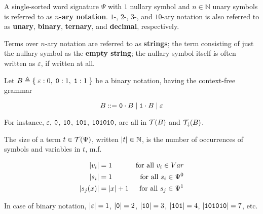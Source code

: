 \begin{definition} A single-sorted word signature $\Psi$ with $1$ nullary
symbol and $n \in \mathbb{N}$ unary symbols is referred to as \textbf{$n$-ary
notation}. $1$-, $2$-, $3$-, and $10$-ary notation is also referred to as
\textbf{unary}, \textbf{binary}, \textbf{ternary}, and \textbf{decimal},
respectively.  \end{definition}

\begin{definition} Terms over $n$-ary notation are referred to as
\textbf{strings}; the term consisting of just the nullary symbol as the
\textbf{empty string}; the nullary symbol itself is often written as
$\varepsilon$, if written at all. \end{definition} 

\begin{example} Let $B \triangleq \mathopen{}\left\{\mathrel{}{\varepsilon : 0, \; \mathtt{0} : 1, \;
\mathtt{1} : 1}\mathrel{}\right\}\mathclose{}$ be a binary notation, having the context-free grammar

$$B ::= \mathtt{0} \cdot B \mid \mathtt{1} \cdot B \mid \varepsilon$$

For instance, $\varepsilon$, $\mathtt{0}$, $\mathtt{1}\mathtt{0}$,
$\mathtt{1}\mathtt{0}\mathtt{1}$, $\mathtt{1}\mathtt{0}\mathtt{1}\mathtt{0}\mathtt{1}\mathtt{0}$,
are all in $\mathcal{T}{\mathopen{}\left({B}\right)\mathclose{}}$ and $\mathcal{T}_\downarrow{\ensuremath{\mathopen{}\left({B}\right)\mathclose{}}}$.

\end{example}

\begin{definition} \label{def:single-sort-word-term-size} The size of a term $t
\in \mathcal{T}{\mathopen{}\left({\Psi}\right)\mathclose{}}$, written ${\mathopen{}\left|{t}\right|\mathclose{}} \in \mathbb{N}$, is the number of
occurrences of symbols and variables in $t$, m.f.

\begin{align*}
{\ensuremath{\mathopen{}\left|{v_i}\right|\mathclose{}}} &= 1 & \text{for all $v_i \in Var$} \\
{\mathopen{}\left|{s_i}\right|\mathclose{}} &= 1 & \text{for all $s_i\in \Psi^0$} \\
{\mathopen{}\left|{s_j{\mathopen{}\left({x}\right)\mathclose{}}}\right|\mathclose{}} &= {\mathopen{}\left|{x}\right|\mathclose{}} + 1 & \text{for all $s_j \in \Psi^1$}
\end{align*}

\end{definition}

\begin{example} In case of binary notation, ${\mathopen{}\left|{\varepsilon}\right|\mathclose{}}=1$,
${\mathopen{}\left|{\mathtt{0}}\right|\mathclose{}} = 2$, ${\mathopen{}\left|{\mathtt{1}\mathtt{0}}\right|\mathclose{}} = 3$,
${\mathopen{}\left|{\mathtt{1}\mathtt{0}\mathtt{1}}\right|\mathclose{}} = 4$,
${\mathopen{}\left|{\mathtt{1}\mathtt{0}\mathtt{1}\mathtt{0}\mathtt{1}\mathtt{0}}\right|\mathclose{}} = 7$, etc.
\end{example}

